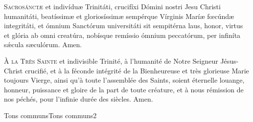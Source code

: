 \documentclass[nocturnal_bvm_fr.tex]{subfiles}
\begin{document}



\begin{paracol}{2}
\lettrine{S}{acrosánctæ} et indivíduæ Trinitáti, crucifíxi Dómini nostri Jesu Christi humanitáti, beatíssimæ et gloriosíssimæ sempérque Vírginis Maríæ fœcúndæ integritáti, et ómnium Sanctórum universitáti sit sempitérna laus, honor, virtus et glória ab omni creatúra, nobísque remíssio ómnium peccatórum, per infiníta sǽcula sæculórum. Amen.

\switchcolumn
\vspace{-1mm}
\lettrine{À}{ la Très Sainte} et indivisible Trinité, 
à l'humanité de Notre Seigneur Jésus-Christ crucifié, 
et à la féconde intégrité de la Bienheureuse et très glorieuse Marie toujours Vierge, 
ainsi qu'à toute l'assemblée des Saints, soient éternelle louange, honneur, puissance et gloire 
de la part de toute créature, et à nous rémission de nos péchés, pour l'infinie durée des siècles. Amen.

\end{paracol}


	{Tons communs}{Tons communs}{2}{}{}{}{}{}{}
\end{document}
